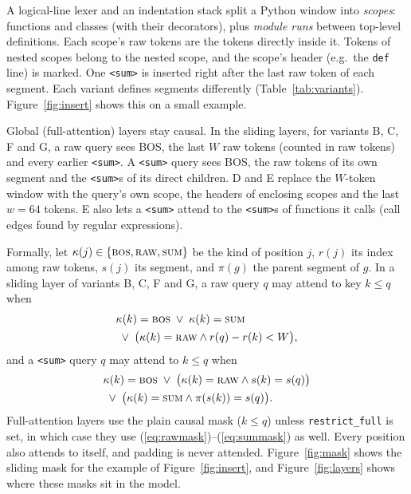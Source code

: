 \documentclass[10pt,twocolumn]{article}
\makeatletter
\renewcommand{\paragraph}{\@startsection{paragraph}{4}{\z@}{6pt}{-0.6em}{\normalfont\normalsize\bfseries}}
\newcommand{\sumtok}{\texttt{<sum>}}
\makeatother
\begin{document}
\paragraph{Segments.}
A logical-line lexer and an indentation stack split a Python window into
\emph{scopes}: functions and classes (with their decorators), plus
\emph{module runs} between top-level definitions. Each scope's raw tokens are
the tokens directly inside it. Tokens of nested scopes belong to the nested
scope, and the scope's header (e.g.\ the \texttt{def} line) is marked. One
\sumtok{} is inserted right after the last raw token of each segment. Each
variant defines segments differently (Table~\ref{tab:variants}).
Figure~\ref{fig:insert} shows this on a small example.

\paragraph{Masks.}
Global (full-attention) layers stay causal. In the sliding layers, for
variants B, C, F and G, a raw query sees BOS, the last $W$ raw tokens (counted
in raw tokens) and every earlier \sumtok{}. A \sumtok{} query sees BOS, the raw
tokens of its own segment and the \sumtok{}s of its direct children. D and E
replace the $W$-token window with the query's own scope, the headers of
enclosing scopes and the last $w=64$ tokens. E also lets a \sumtok{} attend to
the \sumtok{}s of functions it calls (call edges found by regular expressions).

Formally, let $\kappa(j)\in\{\textsc{bos},\textsc{raw},\textsc{sum}\}$ be the
kind of position $j$, $r(j)$ its index among raw tokens, $s(j)$ its segment,
and $\pi(g)$ the parent segment of $g$. In a sliding layer of variants B, C, F
and G, a raw query $q$ may attend to key $k\le q$ when
\begin{equation}
\begin{aligned}
&\kappa(k)=\textsc{bos} \;\lor\; \kappa(k)=\textsc{sum}\\
&\;\lor\; \bigl(\kappa(k)=\textsc{raw} \land r(q)-r(k)<W\bigr),
\end{aligned}
\label{eq:rawmask}
\end{equation}
and a \sumtok{} query $q$ may attend to $k\le q$ when
\begin{equation}
\begin{aligned}
&\kappa(k)=\textsc{bos} \;\lor\; \bigl(\kappa(k)=\textsc{raw}\land s(k)=s(q)\bigr)\\
&\;\lor\; \bigl(\kappa(k)=\textsc{sum}\land \pi(s(k))=s(q)\bigr).
\end{aligned}
\label{eq:summask}
\end{equation}
Full-attention layers use the plain causal mask ($k\le q$) unless
\texttt{restrict\_full} is set, in which case they use
(\ref{eq:rawmask})--(\ref{eq:summask}) as well. Every position also attends to
itself, and padding is never attended.
Figure~\ref{fig:mask} shows the sliding mask for the example of
Figure~\ref{fig:insert}, and Figure~\ref{fig:layers} shows where these masks
sit in the model.
\end{document}
